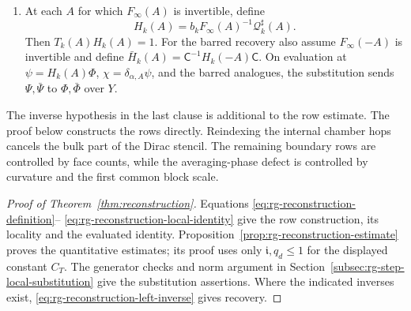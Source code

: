 \begin{theorem}
\begin{enumerate}[label=\textup{(\roman*)},leftmargin=*]
\item At each \(A\) for which \(F_\infty(A)\) is invertible,
define
\[
 H_k(A)=b_kF_\infty(A)^{-1}\mathcal Q_k^\sharp(A).
\]
Then \(T_k(A)H_k(A)=1\).
For the barred recovery also assume \(F_\infty(-A)\) is
invertible and define
\(\bar H_k(A)=\mathsf C^{-1}H_k(-A)\mathsf C\).
On evaluation at \(\psi=H_k(A)\Phi\),
\(\chi=\delta_{\alpha,A}\psi\), and the barred analogues,
the substitution sends \(\Psi,\bar\Psi\) to \(\Phi,\bar\Phi\)
over \(Y\).
\end{enumerate}
\end{theorem}

The inverse hypothesis in the last clause is additional to the
row estimate. The proof below constructs the rows directly.
Reindexing the internal chamber hops cancels the bulk part of
the Dirac stencil. The remaining boundary rows are controlled by
face counts, while the averaging-phase defect is controlled by
curvature and the first common block scale.



\begin{proof}[Proof of Theorem~\ref{thm:reconstruction}]
Equations \eqref{eq:rg-reconstruction-definition}--%
\eqref{eq:rg-reconstruction-local-identity} give the row
construction, its locality and the evaluated identity.
Proposition~\ref{prop:rg-reconstruction-estimate} proves the
quantitative estimates; its proof uses only
\(\mathfrak i,q_d\le1\) for the displayed constant \(C_T\).
The generator checks and norm argument in
Section~\ref{subsec:rg-step-local-substitution} give the
substitution assertions. Where the indicated inverses exist,
\eqref{eq:rg-reconstruction-left-inverse} gives recovery.
\end{proof}
